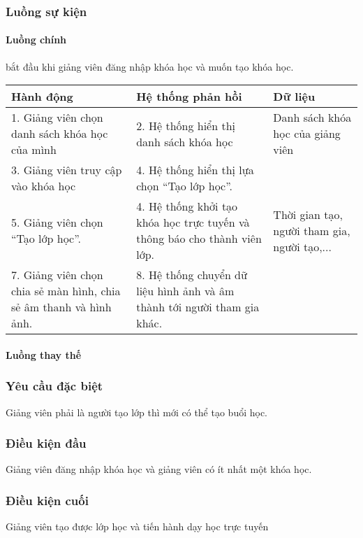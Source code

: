 \documentclass[./../main_file.tex]{subfiles}
\begin{document}
\subsubsection{Luồng sự kiện}
\paragraph{Luồng chính}
bắt đầu khi giảng viên đăng nhập khóa học và muốn tạo khóa học.
\begin{table}[H]
				\begin{tabular}{|p{.33\textwidth}|p{}|p{}|}
		\hline
		\textbf{Hành động}              & \textbf{Hệ thống phản hồi}                 & \textbf{Dữ liệu} \\ \hline
		1. Giảng viên chọn danh sách khóa học của mình & 2. Hệ thống hiển thị danh sách khóa học & Danh sách khóa học của giảng viên \\ \hline 
		3. Giảng viên truy cập vào khóa học & 4. Hệ thống hiển thị lựa chọn “Tạo lớp học”. &                  \\ \hline
		5. Giảng viên chọn “Tạo lớp học”.                                  & 4. Hệ thống khởi tạo khóa học trực tuyến và thông báo cho thành viên lớp. &  Thời gian tạo, người tham gia, người tạo,... \\ \hline
		7. Giảng viên chọn chia sẻ màn hình, chia sẻ âm thanh và hình ảnh. & 8. Hệ thống chuyển dữ liệu hình ảnh và âm thành tới người tham gia khác. &  \\ \hline
	\end{tabular}
\end{table}
\paragraph{Luồng thay thế}
\subsubsection{Yêu cầu đặc biệt}
Giảng viên phải là người tạo lớp thì mới có thể tạo buổi học.

\subsubsection{Điều kiện đầu}
Giảng viên đăng nhập khóa học và giảng viên có ít nhất một khóa học.

\subsubsection{Điều kiện cuối}
Giảng viên tạo được lớp học và tiến hành dạy học trực tuyến
\end{document}
